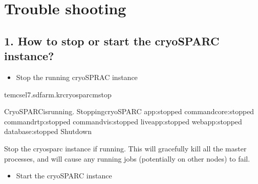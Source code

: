 \documentclass[a4paper,11pt,english]{sphinxmanual}
\begin{document}
\section{Trouble shooting}
\label{\detokenize{cryoSPARC:trouble-shooting}}

\subsection{1. How to stop or start the cryoSPARC instance?}
\label{\detokenize{cryoSPARC:how-to-stop-or-start-the-cryosparc-instance}}\begin{itemize}
\item {} 
\sphinxAtStartPar
Stop the running cryoSPRAC instance

\end{itemize}

\begin{sphinxVerbatim}[commandchars=\\\{\}]
tem\PYGZhy{}cs\PYGZhy{}el7.sdfarm.kr\PYGZdl{}\PYGZgt{}cryosparcmstop

CryoSPARCisrunning.
StoppingcryoSPARC
app:stopped
command\PYGZus{}core:stopped
command\PYGZus{}rtp:stopped
command\PYGZus{}vis:stopped
liveapp:stopped
webapp:stopped
database:stopped
Shutdown
\end{sphinxVerbatim}

\sphinxAtStartPar
Stop the cryosparc instance if running. This will gracefully kill all the master processes, and will cause any running jobs (potentially on other nodes) to fail.
\begin{itemize}
\item {} 
\sphinxAtStartPar
Start the cryoSPARC instance

\end{itemize}
\end{document}
